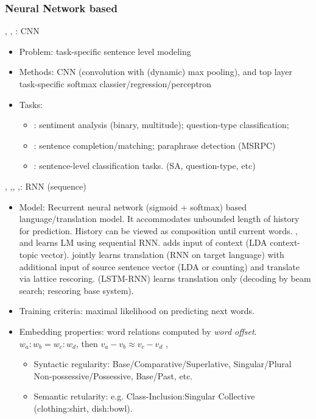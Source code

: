 \documentclass{article} %
\begin{document}
\subsubsection{Neural Network based}
\cite{kalchbrenner2014convolutional}, \cite{hu2014convolutional},
\cite{kim2014convolutional}: CNN
\begin{itemize}
\item Problem: task-specific sentence level modeling
\item Methods: CNN (convolution with (dynamic) max pooling), and top
	layer task-specific softmax classier/regression/perceptron
\item Tasks:
	\begin{itemize}
	\item \cite{kalchbrenner2014convolutional}: sentiment analysis
		(binary, multitude); question-type classification;
	\item \cite{hu2014convolutional}: sentence completion/matching;
		paraphrase detection (MSRPC)
	\item \cite{kim2014convolutional}: sentence-level classification
		tasks. (SA, question-type, etc)
	\end{itemize}
\end{itemize}

\cite{mikolov2010recurrent}, \cite{mikolov2012context},\cite{mikolov2013linguistic},
\cite{auli2013joint},\cite{sutskever2014sequence}: RNN (sequence)
\begin{itemize}
\item Model: Recurrent neural network (sigmoid + softmax) based
	language/translation model.
	It accommodates unbounded length of history for prediction. History
	can be viewed as composition until current words.
	\cite{mikolov2010recurrent}, \cite{mikolov2013linguistic} and learns
		LM using sequential RNN. \cite{mikolov2012context} adds input of
		context (LDA context-topic vector). \cite{auli2013joint} jointly
		learns translation (RNN on target language) with additional
		input of source sentence	vector (LDA or counting) and translate
		via lattice rescoring.
	\cite{sutskever2014sequence} (LSTM-RNN) learns translation only
		(decoding by beam search; rescoring base system).
\item Training criteria: maximal likelihood on predicting next words.
\item Embedding properties: word relations computed by \textit{word offset}.
    $w_a:w_b = w_c:w_d$, then $v_a - v_b \approx v_c - v_d$
    \cite{mikolov2010recurrent}, \cite{mikolov2013linguistic}
	\begin{itemize}
	\item Syntactic regularity: Base/Comparative/Superlative, Singular/Plural
	    Non-possessive/Possessive, Base/Past, etc.
	\item Semantic retularity: e.g. Class-Inclusion:Singular Collective
	    (clothing:shirt, dish:bowl).
	\end{itemize}
\end{itemize}
\end{document}
